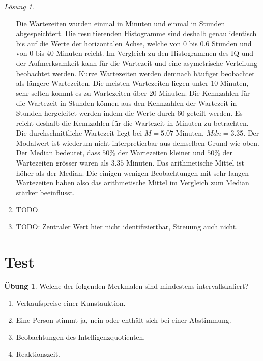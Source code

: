 \documentclass[
]{book}
\providecommand{\tightlist}{%
  \setlength{\itemsep}{0pt}\setlength{\parskip}{0pt}}
\theoremstyle{definition}
\theoremstyle{definition}
\theoremstyle{definition}
\newtheorem{exercise}{Übung}[chapter]
\theoremstyle{definition}
\theoremstyle{remark}
\newtheorem*{solution}{Lösung}
\begin{document}
\begin{solution}
\begin{enumerate}
  Die Wartezeiten wurden einmal in Minuten und einmal in Stunden abgespeichtert. Die resultierenden Histogramme sind deshalb genau identisch bis auf die Werte der horizontalen Achse, welche von \(0\) bis \(0.6\) Stunden und von \(0\) bis \(40\) Minuten reicht. Im Vergleich zu den Histogrammen des IQ und der Aufmerksamkeit kann für die Wartezeit und eine asymetrische Verteilung beobachtet werden. Kurze Wartezeiten werden demnach häufiger beobachtet als längere Wartezeiten. Die meisten Wartezeiten liegen unter \(10\) Minuten, sehr selten kommt es zu Wartezeiten über \(20\) Minuten. Die Kennzahlen für die Wartezeit in Stunden können aus den Kennzahlen der Wartezeit in Stunden hergeleitet werden indem die Werte durch \(60\) geteilt werden. Es reicht deshalb die Kennzahlen für die Wartezeit in Minuten zu betrachten. Die durchschnittliche Wartezeit liegt bei \(M=5.07\) Minuten, \(Mdn = 3.35\). Der Modalwert ist wiederum nicht interpretierbar aus demselben Grund wie oben. Der Median bedeutet, dass \(50\%\) der Wartezeiten kleiner und \(50\%\) der Wartezeiten grösser waren als \(3.35\) Minuten. Das arithmetische Mittel ist höher als der Median. Die einigen wenigen Beobachtungen mit sehr langen Wartezeiten haben also das arithmetische Mittel im Vergleich zum Median stärker beeinflusst.
\item
  TODO.
\item
  TODO: Zentraler Wert hier nicht identifiziertbar, Streuung auch nicht.
\end{enumerate}

\end{solution}

\section{Test}\label{intervallskaliertes-merkmal-test}

\begin{exercise}
\leavevmode

Welche der folgenden Merkmalen sind mindestens intervallskaliert?

\begin{enumerate}
\def\labelenumi{\alph{enumi})}
\tightlist
\item
  Verkaufspreise einer Kunstauktion.
\item
  Eine Person stimmt ja, nein oder enthält sich bei einer Abstimmung.
\item
  Beobachtungen des Intelligenzquotienten.
\item
  Reaktionszeit.
\end{enumerate}

\end{exercise}
\end{document}

